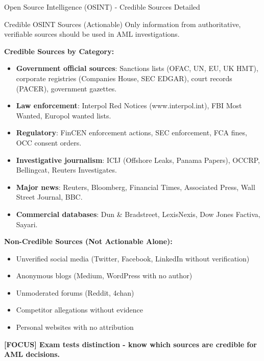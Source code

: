 \documentclass[11pt,a4paper]{beamer}
\newcommand{\examfocus}[1]{\textcolor{orange!80!black}{\textbf{[FOCUS] #1}}}
\begin{document}
\begin{frame}{Open Source Intelligence (OSINT) - Credible Sources Detailed}
	\begin{block}{Credible OSINT Sources (Actionable)}
		Only information from authoritative, verifiable sources should be used in AML investigations.
	\end{block}
	\textbf{Credible Sources by Category:}
	\begin{itemize}
		\item \textbf{Government official sources}: Sanctions lists (OFAC, UN, EU, UK HMT), corporate registries (Companies House, SEC EDGAR), court records (PACER), government gazettes.
		\item \textbf{Law enforcement}: Interpol Red Notices (www.interpol.int), FBI Most Wanted, Europol wanted lists.
		\item \textbf{Regulatory}: FinCEN enforcement actions, SEC enforcement, FCA fines, OCC consent orders.
		\item \textbf{Investigative journalism}: ICIJ (Offshore Leaks, Panama Papers), OCCRP, Bellingcat, Reuters Investigates.
		\item \textbf{Major news}: Reuters, Bloomberg, Financial Times, Associated Press, Wall Street Journal, BBC.
		\item \textbf{Commercial databases}: Dun \& Bradstreet, LexisNexis, Dow Jones Factiva, Sayari.
	\end{itemize}
	\textbf{Non-Credible Sources (Not Actionable Alone):}
	\begin{itemize}
		\item Unverified social media (Twitter, Facebook, LinkedIn without verification)
		\item Anonymous blogs (Medium, WordPress with no author)
		\item Unmoderated forums (Reddit, 4chan)
		\item Competitor allegations without evidence
		\item Personal websites with no attribution
	\end{itemize}
	\examfocus{Exam tests distinction - know which sources are credible for AML decisions.}
\end{frame}
\end{document}
